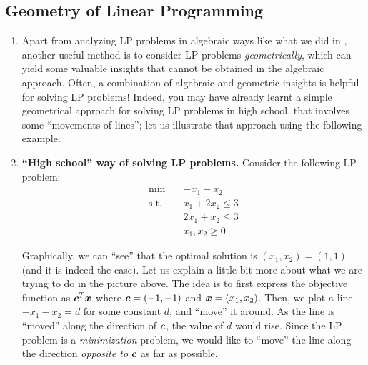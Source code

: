 \subsection{Geometry of Linear Programming}
\label{subsect:lp-geom}
\begin{enumerate}
\item Apart from analyzing LP problems in algebraic ways like what we did in
, another useful method is to consider LP
problems \emph{geometrically}, which can yield some valuable insights that
cannot be obtained in the algebraic approach. Often, a combination of algebraic
and geometric insights is helpful for solving LP problems! Indeed, you may have
already learnt a simple geometrical approach for solving LP problems in high
school, that involves some ``movements of lines''; let us illustrate that
approach using the following example.

\item \textbf{``High school'' way of solving LP problems.}
Consider the following LP problem:
\begin{align*}
\text{min}\quad&-x_1-x_2 \\
\text{s.t.}\quad&x_1+2x_2\le 3\\
\quad&2x_1+x_2\le 3 \\
\quad&x_1,x_2\ge 0
\end{align*}
\begin{center}
\end{center}
Graphically, we can ``see''  that the
optimal solution is \((x_1,x_2)=(1,1)\) (and it is
indeed the case). Let us explain a little bit more
about what we are trying to do in the picture above.
The idea is to first express the objective function as
\(\bm{c}^{T}\bm{x}\) where \(\bm{c}=(-1,-1)\) and
\(\bm{x}=(x_1,x_2)\). Then, we plot a line
\(-x_1-x_2=d\) for some constant \(d\), and ``move'' it around. As the line is ``moved'' along the direction of \(\bm{c}\), the value of \(d\) would rise. Since the LP problem is a \emph{minimization} problem, we would like to ``move'' the line along the direction \emph{opposite to} \(\bm{c}\) as far as possible.


\end{enumerate}
